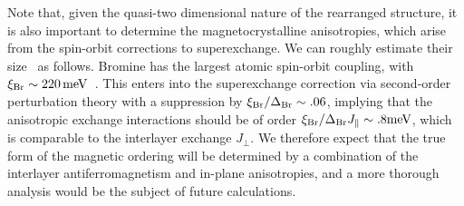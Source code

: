 \documentclass[aps,prl,showpacs,twocolumn,superscriptaddress,floatfix]{revtex4-2}
\begin{document}
Note that, given the quasi-two dimensional nature of the rearranged structure, it is also important to determine the magnetocrystalline anisotropies, which arise from the spin-orbit corrections to superexchange. We can roughly estimate their size~\cite{Tartaglia.2020,Stavropoulos.2021} as follows.
Bromine has the largest atomic spin-orbit coupling, with $\xi_{\rm Br} \sim \SI{220}{\meV}$~\cite{Tartaglia.2020}.
This enters into the superexchange correction via second-order perturbation theory with a suppression by $\xi_{\rm Br}/\Delta_{\rm Br}\sim .06$, implying that the anisotropic exchange interactions should be of order $\xi_{\rm Br}/\Delta_{\rm Br} J_{\parallel} \sim .8\si{\meV}$, which is comparable to the interlayer exchange $J_{\perp}$.
We therefore expect that the true form of the magnetic ordering will be determined by a combination of the interlayer antiferromagnetism and in-plane anisotropies, and a more thorough analysis would be the subject of future calculations.


\end{document}
